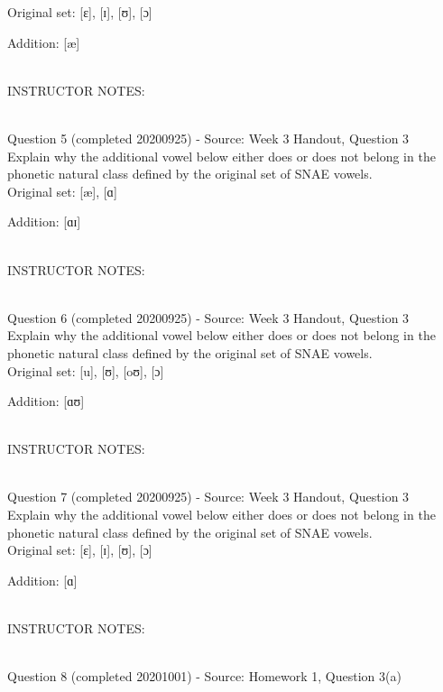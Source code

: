 \documentclass[12pt]{article}
\begin{document}
Original set: {[ɛ]}, {[ɪ]}, {[ʊ]}, {[ɔ]}

Addition: {[æ]}


~\\
INSTRUCTOR NOTES: 


~\\

{\large Question 5} (completed 20200925) - Source: Week 3 Handout, Question 3\\

Explain why the additional vowel below either does or does not belong in the phonetic natural class defined by the original set of SNAE vowels.\\

Original set: {[æ]}, {[ɑ]}

Addition: {[ɑɪ]}


~\\
INSTRUCTOR NOTES: 


~\\

{\large Question 6} (completed 20200925) - Source: Week 3 Handout, Question 3\\

Explain why the additional vowel below either does or does not belong in the phonetic natural class defined by the original set of SNAE vowels.\\

Original set: {[u]}, {[ʊ]}, {[oʊ]}, {[ɔ]}

Addition: {[ɑʊ]}


~\\
INSTRUCTOR NOTES: 


~\\

{\large Question 7} (completed 20200925) - Source: Week 3 Handout, Question 3\\

Explain why the additional vowel below either does or does not belong in the phonetic natural class defined by the original set of SNAE vowels.\\

Original set: {[ɛ]}, {[ɪ]}, {[ʊ]}, {[ɔ]}

Addition: {[ɑ]}


~\\
INSTRUCTOR NOTES: 


~\\

{\large Question 8} (completed 20201001) - Source: Homework 1, Question 3(a)\\
\end{document}
